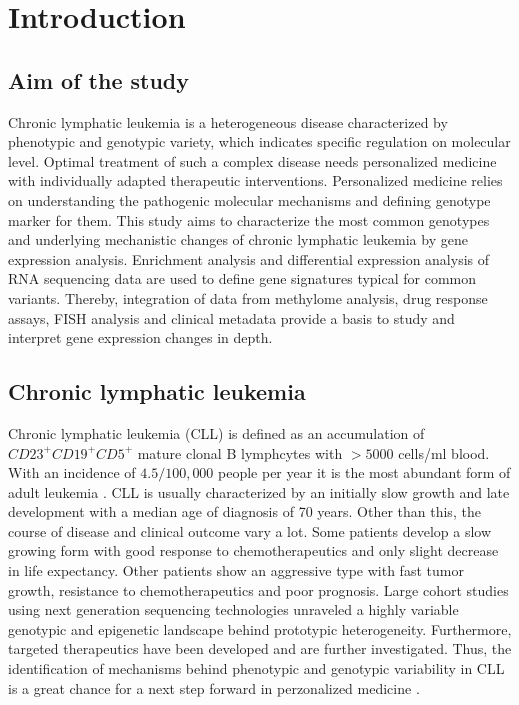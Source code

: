 

\section{Introduction}

\subsection{Aim of the study}
Chronic lymphatic leukemia is a heterogeneous disease characterized by phenotypic and genotypic variety, which indicates specific regulation on molecular level. Optimal treatment of such a complex disease needs personalized medicine with individually adapted therapeutic interventions. Personalized medicine relies on understanding the pathogenic molecular mechanisms and defining genotype marker for them. This study aims to characterize the most common genotypes and underlying mechanistic changes of chronic lymphatic leukemia by gene expression analysis. Enrichment analysis and differential expression analysis of RNA sequencing data are used to define gene signatures typical for common variants. Thereby, integration of data from methylome analysis, drug response assays, FISH analysis and clinical metadata provide a basis to study and interpret gene expression changes in depth.  


\subsection{Chronic lymphatic leukemia}
Chronic lymphatic leukemia (CLL) is defined as an accumulation of $CD23^{+}CD19^{+}CD5^{+}$ mature clonal B lymphcytes with $>5000$ cells/ml blood. With an incidence of $4.5/100,000$ people per year it is the most abundant form of adult leukemia \citep{Fabbri2016}. CLL is usually characterized by an initially slow growth and late development with a median age of diagnosis of 70 years. Other than this, the course of disease and clinical outcome vary a lot. Some patients develop a slow growing form with good response to chemotherapeutics and only slight decrease in life expectancy. Other patients show an aggressive type with fast tumor growth, resistance to chemotherapeutics and poor prognosis. Large cohort studies using next generation sequencing technologies unraveled a highly variable genotypic and epigenetic landscape behind prototypic heterogeneity. Furthermore, targeted therapeutics have been developed and are further investigated. Thus, the identification of mechanisms behind phenotypic and genotypic variability in CLL is a great chance for a next step forward in perzonalized medicine \citep{Guieze2015}.      


